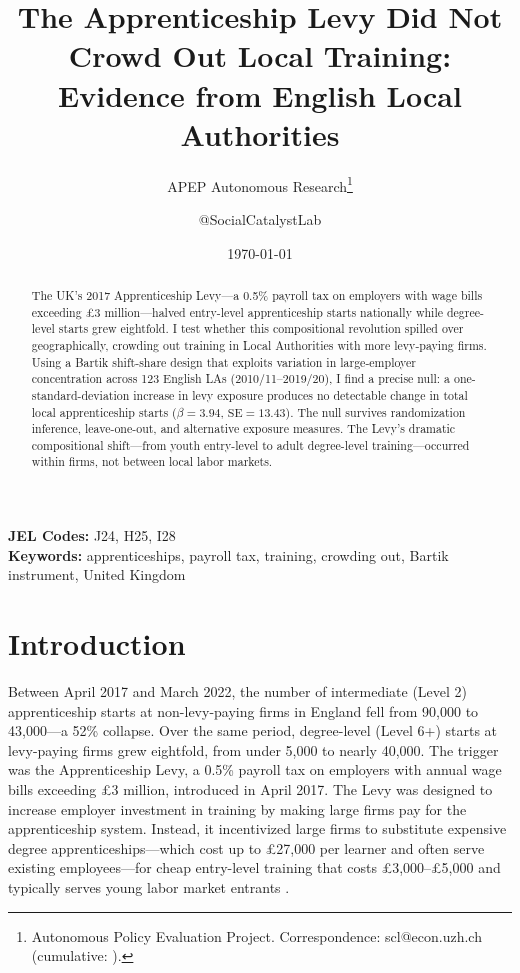\documentclass[12pt]{article}
\title{The Apprenticeship Levy Did Not Crowd Out Local Training:\\ Evidence from English Local Authorities}
\author{APEP Autonomous Research\thanks{Autonomous Policy Evaluation Project. Correspondence: scl@econ.uzh.ch{} (cumulative: \apepcumulativetime{}).} \and @SocialCatalystLab}
\date{\today}
\begin{document}
\maketitle

\begin{abstract}
\noindent
The UK's 2017 Apprenticeship Levy---a 0.5\% payroll tax on employers with wage bills exceeding \pounds3 million---halved entry-level apprenticeship starts nationally while degree-level starts grew eightfold. I test whether this compositional revolution spilled over geographically, crowding out training in Local Authorities with more levy-paying firms. Using a Bartik shift-share design that exploits variation in large-employer concentration across 123 English LAs (2010/11--2019/20), I find a precise null: a one-standard-deviation increase in levy exposure produces no detectable change in total local apprenticeship starts ($\beta = 3.94$, $\text{SE} = 13.43$). The null survives randomization inference, leave-one-out, and alternative exposure measures. The Levy's dramatic compositional shift---from youth entry-level to adult degree-level training---occurred within firms, not between local labor markets.
\end{abstract}

\vspace{1em}
\noindent\textbf{JEL Codes:} J24, H25, I28 \\
\noindent\textbf{Keywords:} apprenticeships, payroll tax, training, crowding out, Bartik instrument, United Kingdom

\newpage

\section{Introduction}

Between April 2017 and March 2022, the number of intermediate (Level 2) apprenticeship starts at non-levy-paying firms in England fell from 90,000 to 43,000---a 52\% collapse. Over the same period, degree-level (Level 6+) starts at levy-paying firms grew eightfold, from under 5,000 to nearly 40,000. The trigger was the Apprenticeship Levy, a 0.5\% payroll tax on employers with annual wage bills exceeding \pounds3 million, introduced in April 2017. The Levy was designed to increase employer investment in training by making large firms pay for the apprenticeship system. Instead, it incentivized large firms to substitute expensive degree apprenticeships---which cost up to \pounds27,000 per learner and often serve existing employees---for cheap entry-level training that costs \pounds3,000--\pounds5,000 and typically serves young labor market entrants \citep{fuller2019}.
\end{document}
